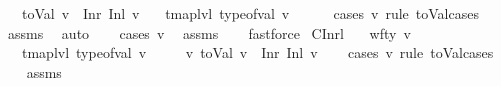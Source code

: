 \begin{isabellebody}
\ \ \ {\isachardoublequoteopen}toVal{}{}{}{}\ v\ {\isacharequal}{\kern0pt}\ Inr\ {\isacharparenleft}{\kern0pt}Inl\ v{\isacharprime}{\kern0pt}{\isacharparenright}{\kern0pt}{\isachardoublequoteclose}\isanewline
\ \ \ {\isachardoublequoteopen}tmap{\isacharunderscore}{\kern0pt}lvl\ {\isacharparenleft}{\kern0pt}type{\isacharunderscore}{\kern0pt}of{\isacharunderscore}{\kern0pt}val\ v{\isacharparenright}{\kern0pt}\ {\isacharequal}{\kern0pt}\ {}{\isachardoublequoteclose}\isanewline
%
\isadelimproof
\ \ %
\endisadelimproof
%
\isatagproof
{}\isamarkupfalse%
\ {\isacharparenleft}{\kern0pt}cases\ v\ rule{\isacharcolon}{\kern0pt}\ toVal{}{}{}{}{\isachardot}{\kern0pt}cases{\isacharparenright}{\kern0pt}\isanewline
\ \ \isamarkupfalse%
\ assms\ \isamarkupfalse%
\ auto\isanewline
\ \ \isamarkupfalse%
\ {\isacharparenleft}{\kern0pt}cases\ v{\isacharprime}{\kern0pt}{\isacharparenright}{\kern0pt}\ \isamarkupfalse%
\ assms\isanewline
\ \ \isamarkupfalse%
\ fastforce{\isacharplus}{\kern0pt}%
\endisatagproof
{\isafoldproof}%
%
\isadelimproof
\isanewline
%
\endisadelimproof
\isanewline
{}\isamarkupfalse%
\ C{}Inrl{\isacharcolon}{\kern0pt}\isanewline
\ \ \ {\isachardoublequoteopen}wf{\isacharunderscore}{\kern0pt}ty\ v{\isachardoublequoteclose}\isanewline
\ \ \ {\isachardoublequoteopen}tmap{\isacharunderscore}{\kern0pt}lvl\ {\isacharparenleft}{\kern0pt}type{\isacharunderscore}{\kern0pt}of{\isacharunderscore}{\kern0pt}val\ v{\isacharparenright}{\kern0pt}\ {\isacharequal}{\kern0pt}\ {}{\isachardoublequoteclose}\isanewline
\ \ \ {\isachardoublequoteopen}{\isasymexists}v{\isacharprime}{\kern0pt}{\isachardot}{\kern0pt}\ toVal{}{}{}{}\ v\ {\isacharequal}{\kern0pt}\ Inr\ {\isacharparenleft}{\kern0pt}Inl\ v{\isacharprime}{\kern0pt}{\isacharparenright}{\kern0pt}{\isachardoublequoteclose}\isanewline
%
\isadelimproof
\ \ %
\endisadelimproof
%
\isatagproof
{}\isamarkupfalse%
\ {\isacharparenleft}{\kern0pt}cases\ v\ rule{\isacharcolon}{\kern0pt}\ toVal{}{}{}{}{\isachardot}{\kern0pt}cases{\isacharparenright}{\kern0pt}\isanewline
\ \ \isamarkupfalse%
\ assms\ \isamarkupfalse%

\end{isabellebody}
